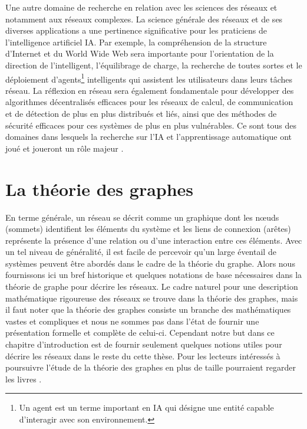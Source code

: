 Une autre domaine de recherche en relation avec les sciences des réseaux et notamment aux réseaux complexes. La science générale des réseaux et de ses diverses applications a une pertinence significative pour les praticiens de l'intelligence artificiel IA. Par exemple, la compréhension de la structure d'Internet et du World Wide Web sera importante pour l'orientation de la direction de l'intelligent, l'équilibrage de charge, la recherche de toutes sortes et le déploiement d'agents\footnote{Un agent est un terme important en IA qui désigne une entité capable d’interagir avec
	son environnement.} intelligents qui assistent les utilisateurs dans leurs tâches réseau. La réflexion en réseau sera également fondamentale pour développer des algorithmes décentralisés efficaces pour les réseaux de calcul, de communication et de détection de plus en plus distribués et liés, ainsi que des méthodes de sécurité efficaces pour ces systèmes de plus en plus vulnérables. Ce sont tous des domaines dans lesquels la recherche sur l'IA et l'apprentissage automatique ont joué et joueront un rôle majeur \cite{Mitchell2006,Basheer-Hajmeerb2000,Passerini-al2017}.

\section{La théorie des graphes}
En terme générale, un réseau se décrit comme un graphique dont les nœuds (sommets) identifient les éléments du
système et les liens de connexion (arêtes) représente la présence d'une relation ou d'une interaction entre ces
éléments. Avec un tel niveau de généralité, il est facile de percevoir qu'un large éventail de systèmes peuvent être abordés
dans le cadre de la théorie du graphe. Alors nous fournissons ici un bref historique et quelques notations de base nécessaires
dans la théorie de graphe pour décrire les réseaux. Le cadre naturel pour une description mathématique rigoureuse des réseaux
se trouve dans la théorie des graphes, mais il faut noter que la théorie des graphes 
consiste un branche des mathématiques vastes et compliques et nous ne sommes pas dans l'état de fournir une présentation formelle et complète de 
celui-ci. Cependant notre but dans ce chapitre d'introduction est de fournir seulement quelques notions utiles pour décrire 
les réseaux dans le reste du cette thèse. Pour les lecteurs intéressés à poursuivre l'étude de la théorie des graphes
en plus de taille pourraient regarder les livres \cite{Ha1995,West1996}.
